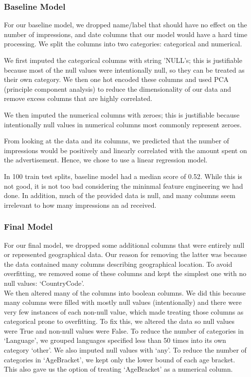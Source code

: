 \documentclass[11pt]{article}
\begin{document}
\hypertarget{baseline-model}{%
\subsubsection{Baseline Model}\label{baseline-model}}

For our baseline model, we dropped name/label that should have no effect
on the number of impressions, and date columns that our model would have
a hard time processing. We split the columns into two categories:
categorical and numerical.

We first imputed the categorical columns with string 'NULL's; this is
justifiable because most of the null values were intentionally null, so
they can be treated as their own category. We then one hot encoded these
columns and used PCA (principle component analysis) to reduce the
dimensionality of our data and remove excess columns that are highly
correlated.

We then imputed the numerical columns with zeroes; this is justifiable
because intentionally null values in numerical columns most commonly
represent zeroes.

From looking at the data and its columns, we predicted that the number
of impressions would be positively and linearly correlated with the
amount spent on the advertisement. Hence, we chose to use a linear
regression model.

In 100 train test splits, baseline model had a median score of 0.52.
While this is not good, it is not too bad considering the mininmal
feature engineering we had done. In addition, much of the provided data
is null, and many columns seem irrelevant to how many impressions an ad
received.

\hypertarget{final-model}{%
\subsubsection{Final Model}\label{final-model}}

For our final model, we dropped some additional columns that were
entirely null or represented geographical data. Our reason for removing
the latter was because the data contained many columns describing
geographical location. To avoid overfitting, we removed some of these
columns and kept the simplest one with no null values: `CountryCode'.\\
We then altered many of the columns into boolean columns. We did this
because many columns were filled with mostly null values (intentionally)
and there were very few instances of each non-null value, which made
treating those columns as categorical prone to overfitting. To fix this,
we altered the data so null values were True and non-null values were
False. To reduce the number of categories in `Language', we grouped
languages specified less than 50 times into its own category `other'. We
also imputed null values with `any'. To reduce the number of categories
in `AgeBracket', we kept only the lower bound of each age bracket. This
also gave us the option of treating `AgeBracket' as a numerical column.
\end{document}

